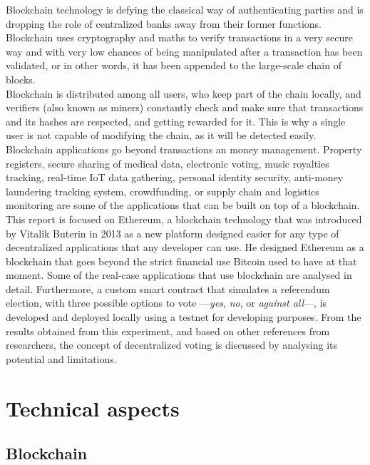 \documentclass[10pt]{article}
\begin{document}
\begin{multicols}{2}
Blockchain technology is defying the classical way of authenticating parties and is dropping the role of centralized banks away from their former functions. Blockchain uses cryptography and maths to verify transactions in a very secure way and with very low chances of being manipulated after a transaction has been validated, or in other words, it has been appended to the large-scale chain of blocks.\\

Blockchain is distributed among all users, who keep part of the chain locally, and verifiers (also known as miners) constantly check and make sure that transactions and its hashes are respected, and getting rewarded for it. This is why a single user is not capable of modifying the chain, as it will be detected easily.\\

Blockchain applications go beyond transactions an money management. Property registers, secure sharing of medical data, electronic voting, music royalties tracking, real-time IoT data gathering, personal identity security, anti-money laundering tracking system, crowdfunding, or supply chain and logistics monitoring are some of the applications that can be built on top of a blockchain.\\

This report is focused on Ethereum, a blockchain technology that was introduced by Vitalik Buterin in 2013 as a new platform designed easier for any type of decentralized applications that any developer can use. He designed Ethereum as a blockchain that goes beyond the strict financial use Bitcoin used to have at that moment. Some of the real-case applications that use blockchain are analysed in detail. Furthermore, a custom smart contract that simulates a referendum election, with three possible options to vote ---\textit{yes}, \textit{no}, or \textit{against all}---, is developed and deployed locally using a testnet for developing purposes. From the results obtained from this experiment, and based on other references from researchers, the concept of decentralized voting is discussed by analysing its potential and limitations.

\section{Technical aspects}

\subsection{Blockchain}


\end{multicols}
\end{document}
